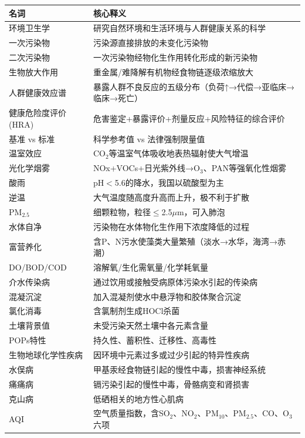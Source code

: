 \begin{table}[htbp]
\centering
\begin{tabularx}{\textwidth}{lX}
\hline
\textbf{名词} & \textbf{核心释义} \\
\hline
环境卫生学 & 研究自然环境和生活环境与人群健康关系的科学 \\
一次污染物 & 污染源直接排放的未变化污染物 \\
二次污染物 & 一次污染物经物化生作用转化形成的新污染物 \\
生物放大作用 & 重金属/难降解有机物经食物链逐级浓缩放大 \\
人群健康效应谱 & 暴露人群不良反应的五级分布（负荷↑→代偿→亚临床→临床→死亡） \\
健康危险度评价(HRA) & 危害鉴定+暴露评价+剂量反应+风险特征的综合评价 \\
基准 vs 标准 & 科学参考值 vs 法律强制限量值 \\
温室效应 & CO$_2$等温室气体吸收地表热辐射使大气增温 \\
光化学烟雾 & NOx+VOCs+日光紫外线→O$_3$、PAN等强氧化性烟雾 \\
酸雨 & pH$<$5.6的降水，我国以硫酸型为主 \\
逆温 & 大气温度随高度升高而上升，极不利于扩散 \\
PM$_{2.5}$ & 细颗粒物，粒径$\leq$2.5$\mu$m，可入肺泡 \\
水体自净 & 污染物在水体物化生作用下浓度降低的过程 \\
富营养化 & 含P、N污水使藻类大量繁殖（淡水→水华，海湾→赤潮） \\
DO/BOD/COD & 溶解氧/生化需氧量/化学耗氧量 \\
介水传染病 & 通过饮用或接触受病原体污染水引起的传染病 \\
混凝沉淀 & 加入混凝剂使水中悬浮物和胶体聚合沉淀 \\
氯化消毒 & 含氯制剂生成HOCl杀菌 \\
土壤背景值 & 未受污染天然土壤中各元素含量 \\
POPs特性 & 持久性、蓄积性、迁移性、高毒性 \\
生物地球化学性疾病 & 因环境中元素过多或过少引起的特异性疾病 \\
水俣病 & 甲基汞经食物链引起的慢性中毒，损害神经系统 \\
痛痛病 & 镉污染引起的慢性中毒，骨骼病变和肾损害 \\
克山病 & 低硒相关的地方性心肌病 \\
AQI & 空气质量指数，含SO$_2$、NO$_2$、PM$_{10}$、PM$_{2.5}$、CO、O$_3$六项 \\
\hline
\end{tabularx}
\end{table}

